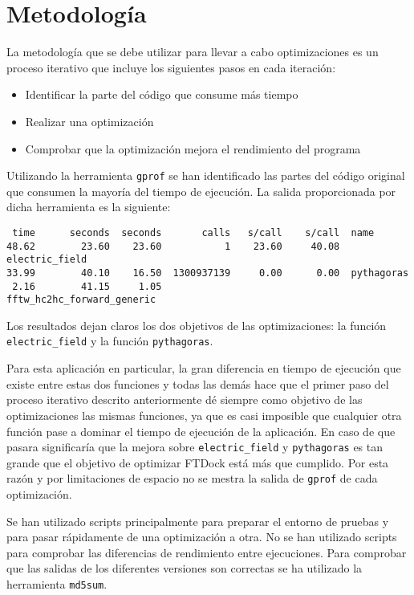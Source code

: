 \section{Metodolog\'{i}a}

La metodolog\'{i}a que se debe utilizar para llevar a cabo optimizaciones es un
proceso iterativo que incluye los siguientes pasos en cada iteraci\'{o}n:

\begin{itemize}
\item Identificar la parte del c\'{o}digo que consume m\'{a}s tiempo
\item Realizar una optimizaci\'{o}n
\item Comprobar que la optimizaci\'{o}n mejora el rendimiento del programa
\end{itemize}

Utilizando la herramienta \texttt{gprof} se han identificado las partes del
c\'{o}digo original que consumen la mayor\'{i}a del tiempo de ejecuci\'{o}n.
La salida proporcionada por dicha herramienta es la siguiente:

\begin{lstlisting}[]
    %   cumulative     self                 self     total
 time      seconds  seconds       calls   s/call    s/call  name
48.62        23.60    23.60           1    23.60     40.08  electric_field
33.99        40.10    16.50  1300937139     0.00      0.00  pythagoras
 2.16        41.15     1.05                                 fftw_hc2hc_forward_generic
\end{lstlisting}


Los resultados dejan claros los dos objetivos de las optimizaciones: la
funci\'{o}n \texttt{electric\_field} y la funci\'{o}n \texttt{pythagoras}.

Para esta aplicaci\'{o}n en particular, la gran diferencia en tiempo de
ejecuci\'{o}n que existe entre estas dos funciones y todas las dem\'{a}s hace
que el primer paso del proceso iterativo descrito anteriormente d\'{e} siempre
como objetivo de las optimizaciones las mismas funciones, ya que es casi
imposible que cualquier otra funci\'{o}n pase a dominar el tiempo de
ejecuci\'{o}n de la aplicaci\'{o}n. En caso de que pasara significar\'{i}a que
la mejora sobre \texttt{electric\_field} y \texttt{pythagoras} es tan grande
que el objetivo de optimizar FTDock est\'{a} m\'{a}s que cumplido. Por esta
raz\'{o}n y por limitaciones de espacio no se mestra la salida de \texttt{gprof}
de cada optimizaci\'{o}n.

Se han utilizado scripts principalmente para preparar el entorno de pruebas y
para pasar r\'{a}pidamente de una optimizaci\'{o}n a otra. No se han utilizado
scripts para comprobar las diferencias de rendimiento entre ejecuciones. Para
comprobar que las salidas de los diferentes versiones son correctas se ha
utilizado la herramienta \texttt{md5sum}.

